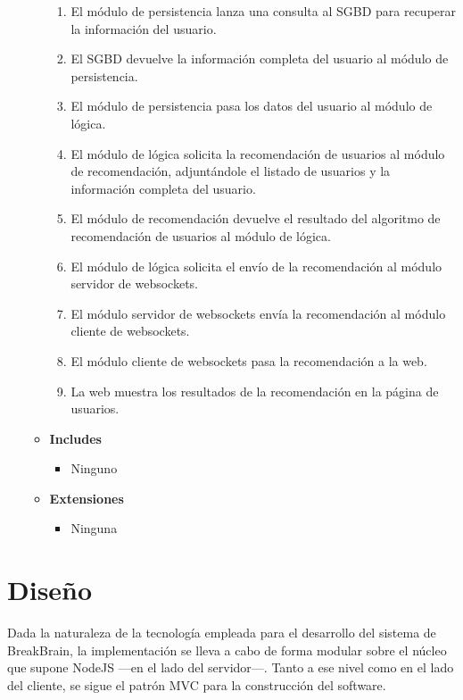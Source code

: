 \begin{enumerate}
\begin{itemize}
\begin{enumerate}
    \item El módulo de persistencia lanza una consulta al SGBD para recuperar la información del usuario.
    \item El SGBD devuelve la información completa del usuario al módulo de persistencia.
    \item El módulo de persistencia pasa los datos del usuario al módulo de lógica.
    \item El módulo de lógica solicita la recomendación de usuarios al módulo de recomendación, adjuntándole el listado de usuarios y la información completa del usuario.
    \item El módulo de recomendación devuelve el resultado del algoritmo de recomendación de usuarios al módulo de lógica.
    \item El módulo de lógica solicita el envío de la recomendación al módulo servidor de websockets.
    \item El módulo servidor de websockets envía la recomendación al módulo cliente de websockets.
    \item El módulo cliente de websockets pasa la recomendación a la web.
    \item La web muestra los resultados de la recomendación en la página de usuarios.
    \end{enumerate}
  \item \textbf{Includes}
    \begin{itemize}
    \item Ninguno
    \end{itemize}
  \item \textbf{Extensiones}
    \begin{itemize}
    \item Ninguna
    \end{itemize}
  \end{itemize}








\end{enumerate}






\section{Diseño}

Dada la naturaleza de la tecnología empleada para el desarrollo del sistema de BreakBrain, la implementación se lleva a cabo de forma modular sobre el núcleo que supone NodeJS ---en el lado del servidor---. Tanto a ese nivel como en el lado del cliente, se sigue el patrón MVC para la construcción del software.

